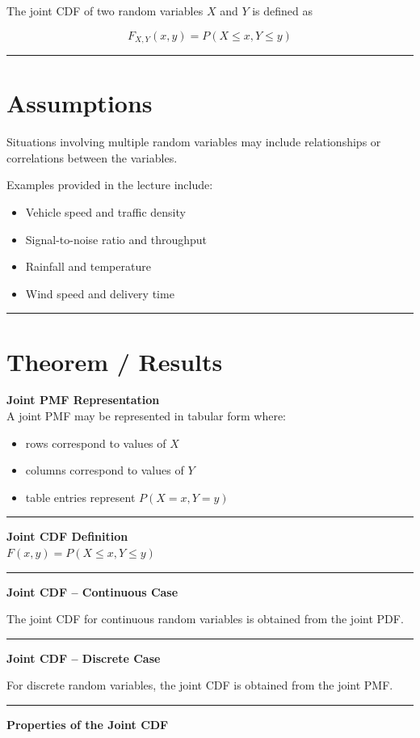 \documentclass[12pt]{article}
\begin{document}
The joint CDF of two random variables $X$ and $Y$ is defined as

\[
F_{X,Y}(x,y) = P(X \le x, Y \le y)
\]
\noindent\rule{\linewidth}{0.4pt}
\section{Assumptions}

Situations involving multiple random variables may include relationships or correlations between the variables.

Examples provided in the lecture include:

\begin{itemize}
\item Vehicle speed and traffic density
\item Signal-to-noise ratio and throughput
\item Rainfall and temperature
\item Wind speed and delivery time
\end{itemize}
\noindent\rule{\linewidth}{0.4pt}
\section{Theorem / Results}

\textbf{Joint PMF Representation}\\

A joint PMF may be represented in tabular form where:

\begin{itemize}
\item rows correspond to values of $X$
\item columns correspond to values of $Y$
\item table entries represent $P(X=x, Y=y)$
\end{itemize}
\noindent\rule{\linewidth}{0.4pt}
\textbf{Joint CDF Definition}\\
$F(x,y) = P(X \le x, Y \le y)$\\
\noindent\rule{\linewidth}{0.4pt}
\textbf{Joint CDF -- Continuous Case}

The joint CDF for continuous random variables is obtained from the joint PDF.\\
\noindent\rule{\linewidth}{0.4pt}
\textbf{Joint CDF -- Discrete Case}

For discrete random variables, the joint CDF is obtained from the joint PMF.\\
\noindent\rule{\linewidth}{0.4pt}
\textbf{Properties of the Joint CDF}
\end{document}
